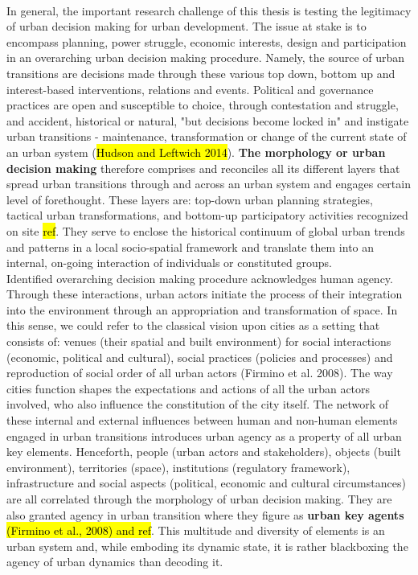 \documentclass[11pt]{report}
\begin{document}
\\
In general, the important research challenge of this thesis is testing the legitimacy of urban decision making for urban development. The issue at stake is to encompass planning, power struggle, economic interests, design and participation in an overarching urban decision making procedure. Namely, the source of urban transitions are decisions made through these various top down, bottom up and interest-based interventions, relations and events. Political and governance practices are open and susceptible to choice, through contestation and struggle, and accident, historical or natural, "but decisions become locked in" and instigate urban transitions - maintenance, transformation or change of the current state of an urban system (\hl{Hudson and Leftwich 2014}). \textbf{The morphology or urban decision making} therefore comprises and reconciles all its different layers that spread urban transitions through and across an urban system and engages certain level of forethought. These layers are: top-down urban planning strategies, tactical urban transformations, and bottom-up participatory activities recognized on site \hl{ref}. They serve to enclose the historical continuum of global urban trends and patterns in a local socio-spatial framework and translate them into an internal, on-going interaction of individuals or constituted groups.
\\
Identified overarching decision making procedure acknowledges human agency. Through these interactions, urban actors initiate the process of their integration into the environment through an appropriation and transformation of space. In this sense, we could refer to the classical vision upon cities as a setting that consists of: venues (their spatial and built environment) for social interactions (economic, political and cultural), social practices (policies and processes) and reproduction of social order of all urban actors (Firmino et al. 2008). The way cities function shapes the expectations and actions of all the urban actors involved, who also influence the constitution of the city itself. The network of these internal and external influences between human and non-human elements engaged in urban transitions introduces urban agency as a property of all urban key elements. Henceforth, people (urban actors and stakeholders), objects (built environment), territories (space), institutions (regulatory framework), infrastructure and social  aspects (political, economic and cultural circumstances) are all correlated through the morphology of urban decision making. They are also granted agency in urban transition where they figure as \textbf{urban key agents} \hl{(Firmino et al., 2008) and ref}. This multitude and diversity of elements is an urban system and, while emboding its dynamic state, it is rather blackboxing the agency of urban dynamics than decoding it.
\end{document}
